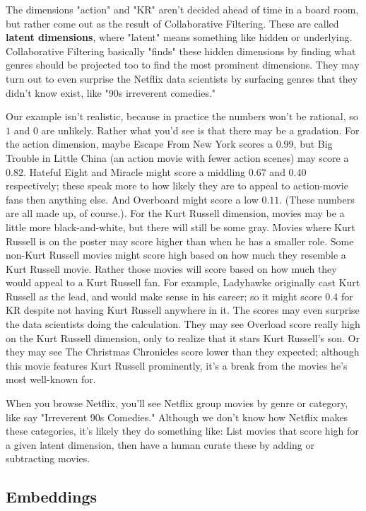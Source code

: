 \documentclass{amsbook}
\begin{document}
The dimensions "action" and "KR" aren't decided ahead of time in a board room, but rather come out as the result of Collaborative Filtering.  These are called {\bf latent dimensions}, where "latent" means something like hidden or underlying.  Collaborative Filtering basically "finds" these hidden dimensions by finding what genres should be projected too to find the most prominent dimensions.  They may turn out to even surprise the Netflix data scientists by surfacing genres that they didn't know exist, like "90s irreverent comedies."

Our example isn't realistic, because in practice the numbers won't be rational, so $1$ and $0$ are unlikely.  Rather what you'd see is that there may be a gradation.  For the action dimension, maybe Escape From New York scores a $0.99$, but Big Trouble in Little China (an action movie with fewer action scenes) may score a $0.82$.  Hateful Eight and Miracle might score a middling $0.67$ and $0.40$ respectively; these speak more to how likely they are to appeal to action-movie fans then anything else.  And Overboard might score a low $0.11$.  (These numbers are all made up, of course.). For the Kurt Russell dimension, movies may be a little more black-and-white, but there will still be some gray.  Movies where Kurt Russell is on the poster may score higher than when he has a smaller role.  Some non-Kurt Russell movies might score high based on how much they resemble a Kurt Russell movie.  Rather those movies will score based on how much they would appeal to a Kurt Russell fan.  For example, Ladyhawke originally cast Kurt Russell as the lead, and would make sense in his career; so it might score 0.4 for KR despite not having Kurt Russell anywhere in it.  The scores may even surprise the data scientists doing the calculation.  They may see Overload score really high on the Kurt Russell dimension, only to realize that it stars Kurt Russell's son.  Or they may see The Christmas Chronicles score lower than they expected; although this movie features Kurt Russell prominently, it's a break from the movies he's most well-known for.

When you browse Netflix, you'll see Netflix group movies by genre or category, like say "Irreverent 90s Comedies."  Although we don't know how Netflix makes these categories, it's likely they do something like:  List movies that score high for a given latent dimension, then have a human curate these by adding or subtracting movies.

\subsection{Embeddings}
\end{document}
